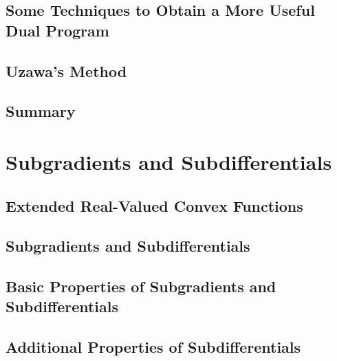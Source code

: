 \documentclass[a4paper]{article}
\begin{document}
\subsection{ Some Techniques to Obtain a More Useful Dual Program} %

\subsection{ Uzawa's Method} %

\subsection{ Summary} %


\newpage
\section{Subgradients and Subdifferentials}
\subsection{ Extended Real-Valued Convex Functions} %

\subsection{ Subgradients and Subdifferentials} %

\subsection{ Basic Properties of Subgradients and Subdifferentials} %

\subsection{ Additional Properties of Subdifferentials} %
\end{document}
